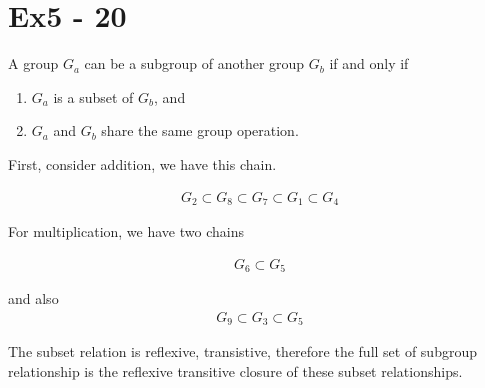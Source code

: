 \section*{Ex5 - 20}
A group $ G_a $ can be a subgroup of another group $ G_b $ if and only if 
\begin{enumerate} 
    \item{$ G_a $ is a subset of $ G_b $, and}
    \item{$ G_a $ and $ G_b $ share the same group operation.}
\end{enumerate} 

First, consider addition, we have this chain.

\begin{eqnarray*}
    G_2 \subset G_8 \subset G_7 \subset G_1 \subset G_4
\end{eqnarray*}

For multiplication, we have two chains

\begin{eqnarray*}
    G_6 \subset G_5
\end{eqnarray*}

and also
\begin{eqnarray*}
    G_9 \subset G_3 \subset G_5
\end{eqnarray*}

The subset relation is reflexive, transistive, therefore the full set of subgroup relationship is the reflexive transitive closure of these subset relationships.